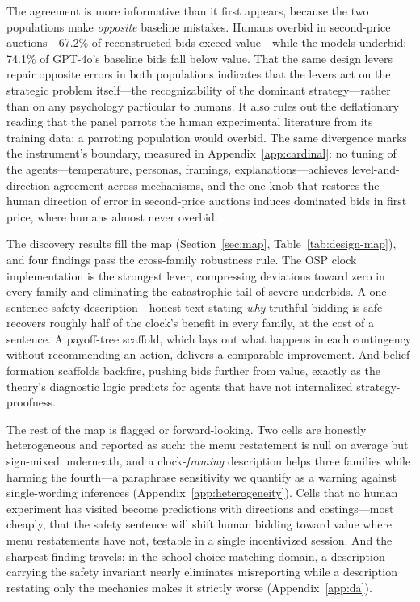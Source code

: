 The agreement is more informative than it first appears, because the two populations make \emph{opposite} baseline mistakes. Humans overbid in second-price auctions---67.2\% of reconstructed bids exceed value---while the models underbid: 74.1\% of GPT-4o's baseline bids fall below value. That the same design levers repair opposite errors in both populations indicates that the levers act on the strategic problem itself---the recognizability of the dominant strategy---rather than on any psychology particular to humans. It also rules out the deflationary reading that the panel parrots the human experimental literature from its training data: a parroting population would overbid. The same divergence marks the instrument's boundary, measured in Appendix~\ref{app:cardinal}: no tuning of the agents---temperature, personas, framings, explanations---achieves level-and-direction agreement across mechanisms, and the one knob that restores the human direction of error in second-price auctions induces dominated bids in first price, where humans almost never overbid.

The discovery results fill the map (Section~\ref{sec:map}, Table~\ref{tab:design-map}), and four findings pass the cross-family robustness rule. The OSP clock implementation is the strongest lever, compressing deviations toward zero in every family and eliminating the catastrophic tail of severe underbids. A one-sentence safety description---honest text stating \emph{why} truthful bidding is safe---recovers roughly half of the clock's benefit in every family, at the cost of a sentence. A payoff-tree scaffold, which lays out what happens in each contingency without recommending an action, delivers a comparable improvement. And belief-formation scaffolds backfire, pushing bids further from value, exactly as the theory's diagnostic logic predicts for agents that have not internalized strategy-proofness.

The rest of the map is flagged or forward-looking. Two cells are honestly heterogeneous and reported as such: the menu restatement is null on average but sign-mixed underneath, and a clock-\emph{framing} description helps three families while harming the fourth---a paraphrase sensitivity we quantify as a warning against single-wording inferences (Appendix~\ref{app:heterogeneity}). Cells that no human experiment has visited become predictions with directions and costings---most cheaply, that the safety sentence will shift human bidding toward value where menu restatements have not, testable in a single incentivized session. And the sharpest finding travels: in the school-choice matching domain, a description carrying the safety invariant nearly eliminates misreporting while a description restating only the mechanics makes it strictly worse (Appendix~\ref{app:da}).

